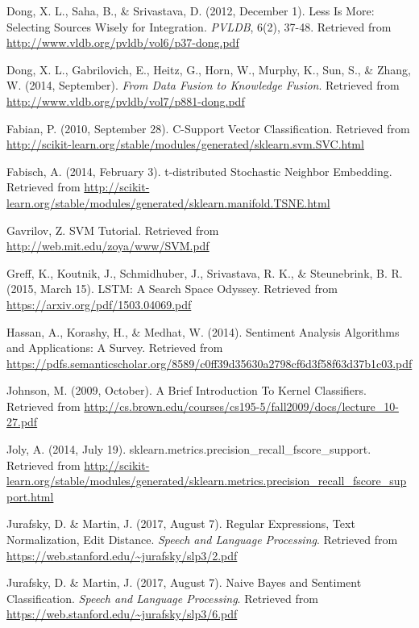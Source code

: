 \begin{thebibliography}{99}
Dong, X. L., Saha, B., \& Srivastava, D. (2012, December 1). Less Is More: Selecting Sources Wisely for Integration. \textit{PVLDB}, 6(2), 37-48. Retrieved from \url{http://www.vldb.org/pvldb/vol6/p37-dong.pdf}

Dong, X. L., Gabrilovich, E., Heitz, G., Horn, W., Murphy, K., Sun, S., \& Zhang, W.  (2014, September). \textit{From Data Fusion to Knowledge Fusion}. Retrieved from \url{http://www.vldb.org/pvldb/vol7/p881-dong.pdf}

Fabian, P. (2010, September 28). C-Support Vector Classification.
Retrieved from \url{http://scikit-learn.org/stable/modules/generated/sklearn.svm.SVC.html}

Fabisch, A. (2014, February 3). t-distributed Stochastic Neighbor Embedding. Retrieved from \url{http://scikit-learn.org/stable/modules/generated/sklearn.manifold.TSNE.html}

Gavrilov, Z. SVM Tutorial. Retrieved from \url{http://web.mit.edu/zoya/www/SVM.pdf}

Greff, K., Koutnik, J., Schmidhuber, J., Srivastava, R. K., \& Steunebrink, B. R. (2015, March 15). LSTM: A Search Space Odyssey. Retrieved from \url{https://arxiv.org/pdf/1503.04069.pdf}

Hassan, A., Korashy, H., \& Medhat, W. (2014). Sentiment Analysis Algorithms and Applications: A Survey. Retrieved from \url{https://pdfs.semanticscholar.org/8589/c0ff39d35630a2798cf6d3f58f63d37b1c03.pdf}

Johnson, M. (2009, October). A Brief Introduction To Kernel Classifiers. Retrieved from \url{http://cs.brown.edu/courses/cs195-5/fall2009/docs/lecture\_10-27.pdf}

Joly, A. (2014, July 19). sklearn.metrics.precision\_recall\_fscore\_support. Retrieved from \url{http://scikit-learn.org/stable/modules/generated/sklearn.metrics.precision\_recall\_fscore\_support.html}

Jurafsky, D. \& Martin, J. (2017, August 7). Regular Expressions, Text Normalization, Edit Distance. \textit{Speech and Language Processing}. Retrieved from \url{https://web.stanford.edu/~jurafsky/slp3/2.pdf}

Jurafsky, D. \& Martin, J. (2017, August 7). Naive Bayes and Sentiment Classification. \textit{Speech and Language Processing}. Retrieved from \url{https://web.stanford.edu/~jurafsky/slp3/6.pdf}


\end{thebibliography}
